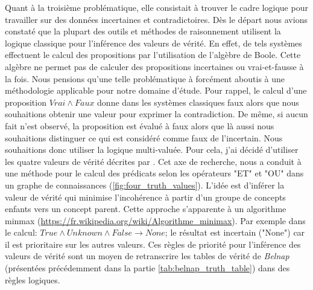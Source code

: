 \begin{refsegment}
Quant à la troisième problématique, elle consistait à trouver le cadre logique pour travailler sur des données incertaines et contradictoires. Dès le départ nous avions constaté que la plupart des  outils et méthodes de raisonnement utilisent la logique classique pour l'inférence des valeurs de vérité. En effet, de tels systèmes effectuent le calcul des propositions par l'utilisation de l'algèbre de Boole. Cette algèbre ne permet pas de calculer des propositions incertaines ou vrai-et-fausse à la fois.  Nous pensions qu'une telle problématique à forcément aboutis à une méthodologie applicable pour notre domaine d'étude. Pour rappel, le calcul d'une proposition $Vrai \land Faux$ donne dans les systèmes classiques faux alors que nous souhaitions obtenir une valeur pour exprimer la contradiction. De même, si aucun fait n’est observé, la proposition est évalué à faux alors que là aussi nous souhaitions distinguer ce qui est  considéré comme faux de l'incertain. Nous souhaitions donc utiliser la logique multi-valuée. Pour cela, j’ai décidé d’utiliser les quatre valeurs de vérité décrites par \citeauthor{belnap77}\cite{belnap77}. Cet axe de recherche, nous a conduit à une méthode pour le calcul des prédicats selon les opérateurs "ET" et "OU" dans un graphe de connaissances (\cref{fig:four_truth_values}). L'idée est d'inférer la valeur de vérité qui minimise l'incohérence à partir  d'un groupe de concepts enfants vers un concept parent. Cette approche s'apparente à un algorithme minmax \cite{aho1989} (\url{https://fr.wikipedia.org/wiki/Algorithme_minimax}). Par exemple dans le calcul: $ True \land Unknown \land False \to None$; le résultat est incertain ("None") car il est prioritaire sur les autres valeurs. Ces règles de priorité pour l'inférence des valeurs de vérité sont un moyen de retranscrire les tables de vérité de \textit{Belnap} (présentées précédemment dans la partie  \cref{tab:belnap_truth_table}) dans des règles logiques.


\end{refsegment}

